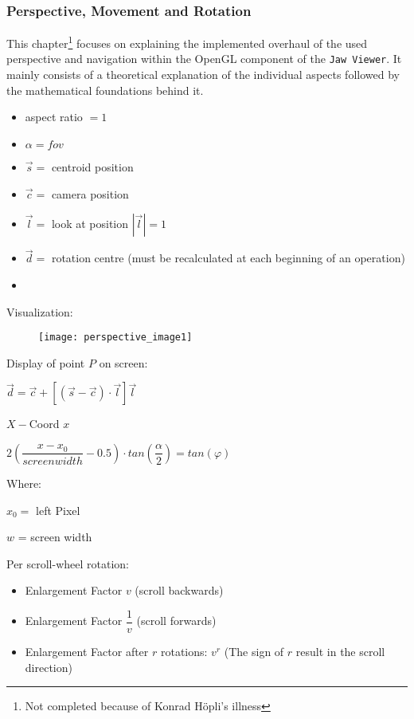 \subsubsection{Perspective, Movement and Rotation}
This chapter\footnote{Not completed because of Konrad H\"opli's illness} focuses on explaining the implemented overhaul of the used perspective and navigation within the OpenGL component of the \verb|Jaw Viewer|. It mainly consists of a theoretical explanation of the individual aspects followed by the mathematical foundations behind it.

\begin{itemize}
	\item[] aspect ratio $= 1$
	\item[] $\alpha = fov$
	\item[] $\overrightarrow{s}=$ centroid position
	\item[] $\overrightarrow{c}=$ camera position
	\item[] $\overrightarrow{l}=$ look at position $|\overrightarrow{l}|= 1$ 
	\item[] $\overrightarrow{d}=$ rotation centre (must be recalculated at each beginning of an operation)
	\item[] 
\end{itemize}
Visualization:
\begin{figure}[h!]
	\centering
	\texttt{[image: perspective\_image1]}
\end{figure}

Display of point $P$ on screen:

\centerline{$\overrightarrow{d} = \overrightarrow{c} +\left[ \left(\overrightarrow{s} -\overrightarrow{c}\right)\cdot \overrightarrow{l}\right] \overrightarrow{l} $}

$X - $Coord $x$

\centerline{$\boxed{ 2 \left(\dfrac{x - x_{0}}{screen width} - 0.5\right)\cdot tan \left(\dfrac{\alpha}{2}\right) = tan(\varphi)}$}

Where: 

$x_{0} =$ left Pixel

$w$ = screen width




Per scroll-wheel rotation:

\begin{itemize}
	\item[]	Enlargement Factor $v$ (scroll backwards)
	\item[]	Enlargement Factor $\dfrac{1}{v}$ (scroll forwards)
	\item[]	Enlargement Factor after $r$ rotations: $v^{r}$ (The sign of $r$ result in the scroll direction)
\end{itemize}

